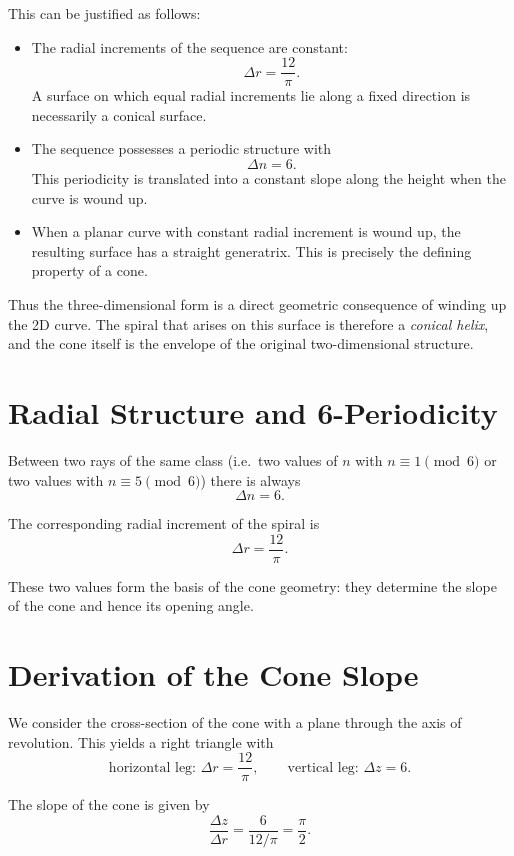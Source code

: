 This can be justified as follows:

\begin{itemize}
  \item The radial increments of the sequence are constant:
  \[
  \Delta r = \frac{12}{\pi}.
  \]
  A surface on which equal radial increments lie along a fixed direction is
  necessarily a conical surface.

  \item The sequence possesses a periodic structure with
  \[
  \Delta n = 6.
  \]
  This periodicity is translated into a constant slope along the height when
  the curve is wound up.

  \item When a planar curve with constant radial increment is wound up, the
  resulting surface has a straight generatrix. This is precisely the defining
  property of a cone.
\end{itemize}

Thus the three-dimensional form is a direct geometric consequence of winding
up the 2D curve. The spiral that arises on this surface is therefore a
\emph{conical helix}, and the cone itself is the envelope of the
original two-dimensional structure.

\section{Radial Structure and 6-Periodicity}

Between two rays of the same class (i.e.\ two values of $n$ with
$n \equiv 1 \pmod{6}$ or two values with $n \equiv 5 \pmod{6}$) there is
always
\[
\Delta n = 6.
\]

The corresponding radial increment of the spiral is
\[
\Delta r = \frac{12}{\pi}.
\]

These two values form the basis of the cone geometry: they determine the
slope of the cone and hence its opening angle.

\section{Derivation of the Cone Slope}

We consider the cross-section of the cone with a plane through the axis of
revolution. This yields a right triangle with
\[
\text{horizontal leg: } \Delta r = \frac{12}{\pi}, \qquad
\text{vertical leg: } \Delta z = 6.
\]

The slope of the cone is given by
\[
\frac{\Delta z}{\Delta r}
= \frac{6}{12/\pi}
= \frac{\pi}{2}.
\]

